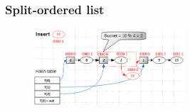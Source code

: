 \documentclass[aspectratio=169, pdf, 8pt, unicode]{beamer}
\begin{document}
\begin{frame}[fragile]
\frametitle{Split-ordered list}
\begin{figure}[H]
\includegraphics[width=0.5\textwidth]{fig/split-ordered-2.png}
\end{figure}
\end{frame}
\end{document}
